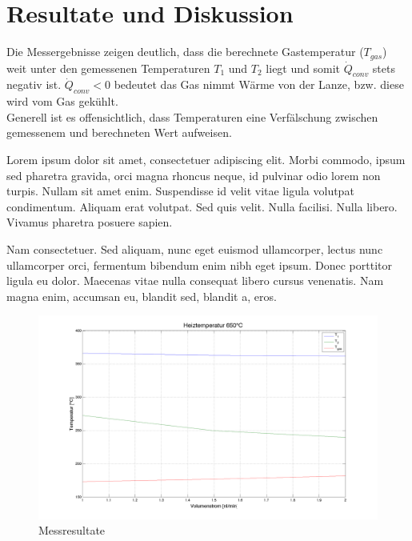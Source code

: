 \chapter{Resultate und Diskussion}\label{sec:results}

Die Messergebnisse zeigen deutlich, dass die berechnete Gastemperatur ($T_{gas}$) weit unter den gemessenen Temperaturen $T_1$ und $T_2$ liegt und somit $\dot Q_{conv}$ stets negativ ist. $\dot Q_{conv} < 0$ bedeutet das Gas nimmt Wärme von der Lanze, bzw. diese wird vom Gas gekühlt.\\
Generell ist es offensichtlich, dass  Temperaturen eine  Verfälschung zwischen gemessenem und berechneten Wert aufweisen.

Lorem ipsum dolor sit amet, consectetuer adipiscing elit. Morbi commodo, ipsum sed pharetra gravida, orci magna rhoncus neque, id pulvinar odio lorem non turpis. Nullam sit amet enim. Suspendisse id velit vitae ligula volutpat condimentum. Aliquam erat volutpat. Sed quis velit. Nulla facilisi. Nulla libero. Vivamus pharetra posuere sapien. 

Nam consectetuer. Sed aliquam, nunc eget euismod ullamcorper, lectus nunc ullamcorper orci, fermentum bibendum enim nibh eget ipsum. Donec porttitor ligula eu dolor. Maecenas vitae nulla consequat libero cursus venenatis. Nam magna enim, accumsan eu, blandit sed, blandit a, eros.

\begin{figure}[H]
\includegraphics[width=\textwidth]{pics/figure1.png}
\caption{Messresultate}
\label{pic:figure1}
\end{figure}


